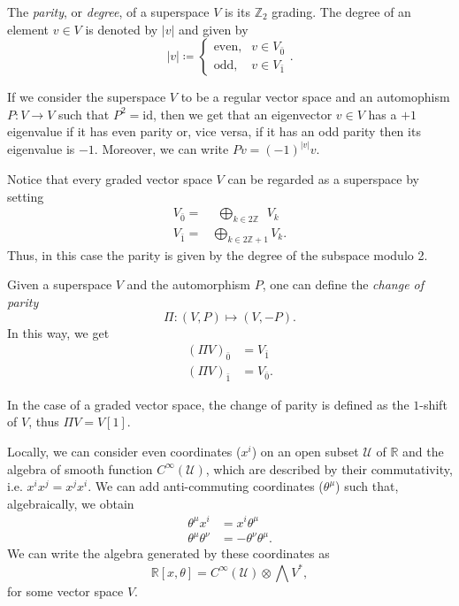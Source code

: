 \begin{definition}
    The \emph{parity}, or \emph{degree}, of a superspace $V$ is its $\mathbb{Z}_2$ grading.
    The degree of an element $v \in V$ is denoted by $|v|$ and given by
    \begin{equation*}
        |v| \coloneqq
        \begin{cases}
            \text{even}, &v \in V_{\bar{0}} \\
            \text{odd},  &v \in V_{\bar{1}}
        \end{cases}.
    \end{equation*}
\end{definition}

If we consider the superspace $V$ to be a regular vector space and an automophism $P: V \rightarrow V$ such that $P^2 = \text{id}$, then we get that an eigenvector $v \in V$ has a $+1$ eigenvalue if it has even parity or, vice versa, if it has an odd parity then its eigenvalue is $-1$.
Moreover, we can write $P v = (-1)^{|v|}v$.

Notice that every graded vector space $V$ can be regarded as a superspace by setting
\begin{align*}
    V_{\bar{0}} =& \; \,\bigoplus_{k \in 2 \mathbb{Z}} \; \, V_k \\
    V_{\bar{1}} =& \bigoplus_{k \in 2 \mathbb{Z} + 1} V_k .
\end{align*}
Thus, in this case the parity is given by the degree of the subspace modulo 2.

Given a superspace $V$ and the automorphism $P$, one can define the \emph{change of parity}
\begin{equation*}
    \Pi : (V, P) \mapsto (V, -P) .
\end{equation*}
In this way, we get
\begin{align*}
    (\Pi V)_{\bar{0}} &= V_{\bar{1}} \\
    (\Pi V)_{\bar{1}} &= V_{\bar{0}} .
\end{align*}

In the case of a graded vector space, the change of parity is defined as the $1$-shift of $V$, thus $\Pi V= V[1]$.

\begin{example}
\label{ex:comm_anticomm}
    Locally, we can consider even coordinates ($x^i$) on an open subset $\mathcal{U}$ of $\mathbb{R}$ and the algebra of smooth function $C^\infty (\mathcal{U})$, which are described by their commutativity, i.e. $x^i x^j = x^j x^i$.
    We can add anti-commuting coordinates ($\theta^\mu$) such that, algebraically, we obtain
    \begin{align*}
        \theta^\mu x^i &= x^i \theta^\mu \\
        \theta^\mu \theta^\nu &= -\theta^\nu \theta^\mu.
    \end{align*}
    We can write the algebra generated by these coordinates as
    \begin{equation*}
        \widehat{\mathbb{R}[x, \theta]} = C^\infty (\mathcal{U}) \otimes \bigwedge V^*,
    \end{equation*}
    for some vector space $V$.
\end{example}